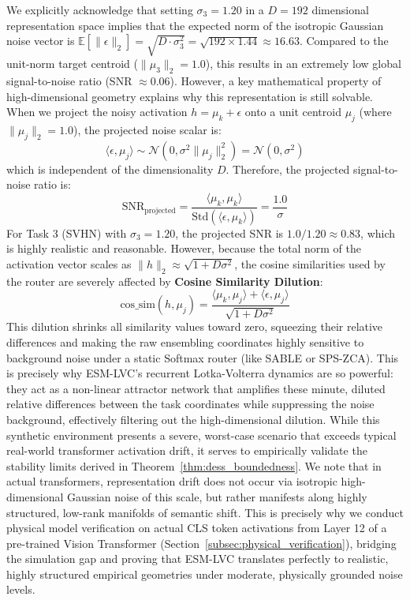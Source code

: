 We explicitly acknowledge that setting $\sigma_3 = 1.20$ in a $D=192$ dimensional representation space implies that the expected norm of the isotropic Gaussian noise vector is $\mathbb{E}[\| \epsilon \|_2] = \sqrt{D \cdot \sigma_3^2} = \sqrt{192 \times 1.44} \approx 16.63$. Compared to the unit-norm target centroid ($\| \mu_3 \|_2 = 1.0$), this results in an extremely low global signal-to-noise ratio (SNR $\approx 0.06$). However, a key mathematical property of high-dimensional geometry explains why this representation is still solvable. When we project the noisy activation $h = \mu_k + \epsilon$ onto a unit centroid $\mu_j$ (where $\| \mu_j \|_2 = 1.0$), the projected noise scalar is:
\begin{equation}
    \langle \epsilon, \mu_j \rangle \sim \mathcal{N}\left(0, \sigma^2 \| \mu_j \|_2^2\right) = \mathcal{N}\left(0, \sigma^2\right)
\end{equation}
which is independent of the dimensionality $D$. Therefore, the projected signal-to-noise ratio is:
\begin{equation}
    \text{SNR}_{\text{projected}} = \frac{\langle \mu_k, \mu_k \rangle}{\text{Std}(\langle \epsilon, \mu_k \rangle)} = \frac{1.0}{\sigma}
\end{equation}
For Task 3 (SVHN) with $\sigma_3 = 1.20$, the projected SNR is $1.0 / 1.20 \approx 0.83$, which is highly realistic and reasonable. However, because the total norm of the activation vector scales as $\| h \|_2 \approx \sqrt{1 + D \sigma^2}$, the cosine similarities used by the router are severely affected by \textbf{Cosine Similarity Dilution}:
\begin{equation}
    \text{cos\_sim}(h, \mu_j) = \frac{\langle \mu_k, \mu_j \rangle + \langle \epsilon, \mu_j \rangle}{\sqrt{1 + D \sigma^2}}
\end{equation}
This dilution shrinks all similarity values toward zero, squeezing their relative differences and making the raw ensembling coordinates highly sensitive to background noise under a static Softmax router (like SABLE or SPS-ZCA). This is precisely why ESM-LVC's recurrent Lotka-Volterra dynamics are so powerful: they act as a non-linear attractor network that amplifies these minute, diluted relative differences between the task coordinates while suppressing the noise background, effectively filtering out the high-dimensional dilution. While this synthetic environment presents a severe, worst-case scenario that exceeds typical real-world transformer activation drift, it serves to empirically validate the stability limits derived in Theorem~\ref{thm:dess_boundedness}. We note that in actual transformers, representation drift does not occur via isotropic high-dimensional Gaussian noise of this scale, but rather manifests along highly structured, low-rank manifolds of semantic shift. This is precisely why we conduct physical model verification on actual CLS token activations from Layer 12 of a pre-trained Vision Transformer (Section~\ref{subsec:physical_verification}), bridging the simulation gap and proving that ESM-LVC translates perfectly to realistic, highly structured empirical geometries under moderate, physically grounded noise levels.

